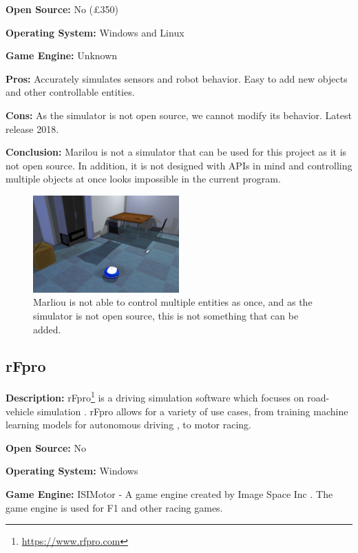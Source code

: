\textbf{Open Source:} No (£350)

\textbf{Operating System:} Windows and Linux

\textbf{Game Engine:} Unknown

\textbf{Pros:} Accurately simulates sensors and robot behavior. Easy to add new objects and other controllable entities. 

\textbf{Cons:} As the simulator is not open source, we cannot modify its behavior. Latest release 2018.

\textbf{Conclusion:} Marilou is not a simulator that can be used for this project as it is not open source. In addition, it is not designed with APIs in mind and controlling multiple objects at once looks impossible in the current program. 

\begin{figure}[H]
    \centering
    \includegraphics[width=0.5\textwidth]{03_Background/Appendix/Simulators/Marilou.jpg}
    \caption{Marliou is not able to control multiple entities as once, and as the simulator is not open source, this is not something that can be added.}
\end{figure}


\subsection{rFpro}
\textbf{Description:} rFpro\footnote{\url{https://www.rfpro.com}} is a driving simulation software which focuses on road-vehicle simulation \cite{rFpro_Web}. rFpro allows for a variety of use cases, from training machine learning models for autonomous driving \cite{rFpro_ML}, to motor racing.

\textbf{Open Source:} No

\textbf{Operating System:} Windows

\textbf{Game Engine:} ISIMotor - A game engine created by Image Space Inc \cite{ISIMotor}. The game engine is used for F1 and other racing games.

